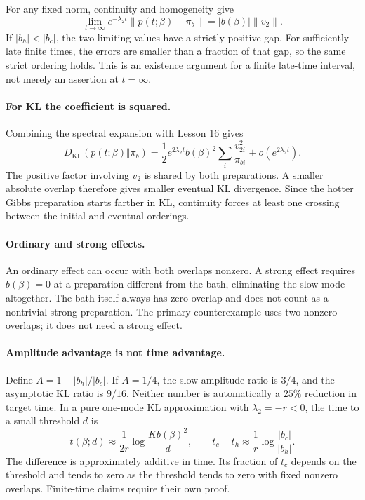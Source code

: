 \documentclass[11pt]{article}
\begin{document}
For any fixed norm, continuity and homogeneity give
\[
\lim_{t\to\infty}e^{-\lambda_2t}\|p(t;\beta)-\pi_b\|
=|b(\beta)|\|v_2\|.
\]
If $|b_h|<|b_c|$, the two limiting values have a strictly positive gap.
For sufficiently late finite times, the errors are smaller than a fraction
of that gap, so the same strict ordering holds. This is an existence argument
for a finite late-time interval, not merely an assertion at $t=\infty$.

\paragraph{For KL the coefficient is squared.}
Combining the spectral expansion with Lesson 16 gives
\[
D_{\mathrm{KL}}(p(t;\beta)\Vert\pi_b)
=\frac12e^{2\lambda_2t}b(\beta)^2
\sum_i\frac{v_{2i}^2}{\pi_{bi}}+o(e^{2\lambda_2t}).
\]
The positive factor involving $v_2$ is shared by both preparations.
A smaller absolute overlap therefore gives smaller eventual KL divergence.
Since the hotter Gibbs preparation starts farther in KL, continuity forces
at least one crossing between the initial and eventual orderings.

\paragraph{Ordinary and strong effects.}
An ordinary effect can occur with both overlaps nonzero. A strong effect
requires $b(\beta)=0$ at a preparation different from the bath, eliminating
the slow mode altogether. The bath itself always has zero overlap and does
not count as a nontrivial strong preparation. The primary counterexample
uses two nonzero overlaps; it does not need a strong effect.

\paragraph{Amplitude advantage is not time advantage.}
Define $A=1-|b_h|/|b_c|$. If $A=1/4$, the slow amplitude ratio is $3/4$,
and the asymptotic KL ratio is $9/16$. Neither number is automatically a
$25\%$ reduction in target time. In a pure one-mode KL approximation with
$\lambda_2=-r<0$, the time to a small threshold $d$ is
\[
t(\beta;d)\approx\frac{1}{2r}
\log\frac{K b(\beta)^2}{d},
\qquad
 t_c-t_h\approx\frac1r\log\frac{|b_c|}{|b_h|}.
\]
The difference is approximately additive in time. Its fraction of $t_c$
depends on the threshold and tends to zero as the threshold tends to zero
with fixed nonzero overlaps. Finite-time claims require their own proof.
\end{document}
